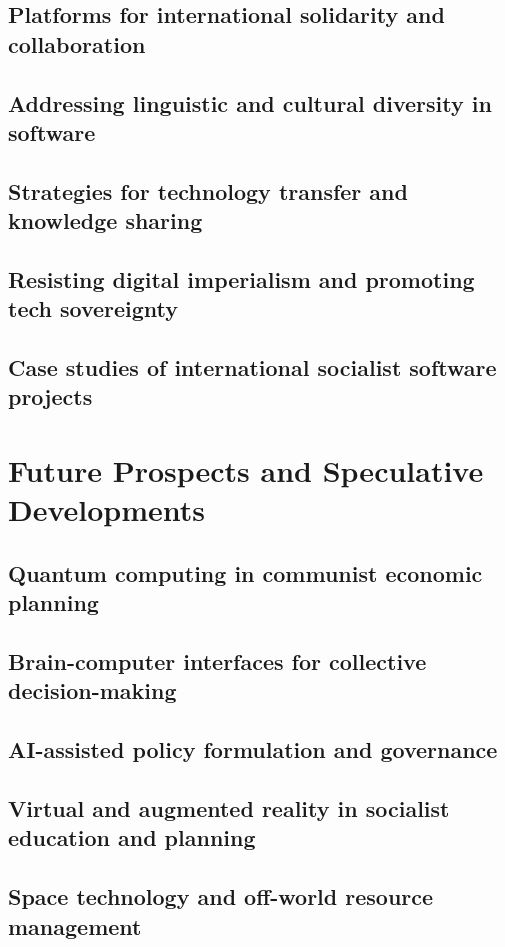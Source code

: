 \subsection{Platforms for international solidarity and collaboration}
\subsection{Addressing linguistic and cultural diversity in software}
\subsection{Strategies for technology transfer and knowledge sharing}
\subsection{Resisting digital imperialism and promoting tech sovereignty}
\subsection{Case studies of international socialist software projects}

\newpage

\section{Future Prospects and Speculative Developments}
\subsection{Quantum computing in communist economic planning}
\subsection{Brain-computer interfaces for collective decision-making}
\subsection{AI-assisted policy formulation and governance}
\subsection{Virtual and augmented reality in socialist education and planning}
\subsection{Space technology and off-world resource management}

